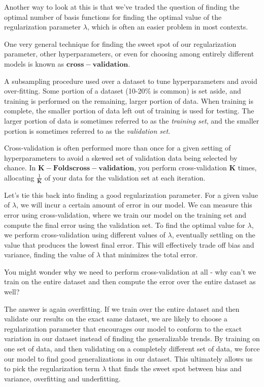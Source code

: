 Another way to look at this is that we've traded the question of finding the optimal number of basis functions for finding the optimal value of the regularization parameter $\lambda$, which is often an easier problem in most contexts.

One very general technique for finding the sweet spot of our regularization parameter, other hyperparameters, or even for choosing among entirely different models is known as $\bm{cross-validation}$.

\begin{definition}
    A subsampling procedure used over a dataset to tune hyperparameters and avoid over-fitting. Some portion of a dataset (10-20\% is common) is set aside, and training is performed on the remaining, larger portion of data. When training is complete, the smaller portion of data left out of training is used for testing. The larger portion of data is sometimes referred to as the \textit{training set}, and the smaller portion is sometimes referred to as the \textit{validation set}.
\end{definition}

Cross-validation is often performed more than once for a given setting of hyperparameters to avoid a skewed set of validation data being selected by chance. In $\bm{K-Folds cross-validation}$, you perform cross-validation $\bm{K}$ times, allocating $\frac{1}{\bm{K}}$ of your data for the validation set at each iteration.

Let's tie this back into finding a good regularization parameter. For a given value of $\lambda$, we will incur a certain amount of error in our model. We can measure this error using cross-validation, where we train our model on the training set and compute the final error using the validation set. To find the optimal value for $\lambda$, we perform cross-validation using different values of $\lambda$, eventually settling on the value that produces the lowest final error. This will effectively trade off bias and variance, finding the value of $\lambda$ that minimizes the total error.

You might wonder why we need to perform cross-validation at all - why can't we train on the entire dataset and then compute the error over the entire dataset as well?

The answer is again overfitting. If we train over the entire dataset and then validate our results on the exact same dataset, we are likely to choose a regularization parameter that encourages our model to conform to the exact variation in our dataset instead of finding the generalizable trends. By training on one set of data, and then validating on a completely different set of data, we force our model to find good generalizations in our dataset. This ultimately allows us to pick the regularization term $\lambda$ that finds the sweet spot between bias and variance, overfitting and underfitting.

